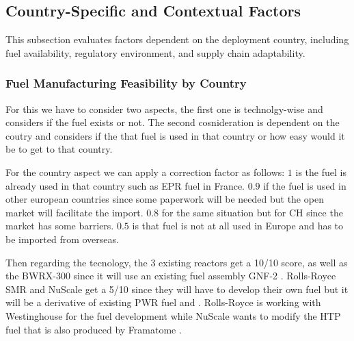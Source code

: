 


\subsection{Country-Specific and Contextual Factors}
This subsection evaluates factors dependent on the deployment country, including fuel availability, regulatory environment, and supply chain adaptability.

\subsubsection{Fuel Manufacturing Feasibility by Country}
For this we have to consider two aspects, the first one is technolgy-wise and considers if the fuel exists or not. The second cosnideration is dependent on the coutry and considers if the that fuel is used in that country or how easy would it be to get to that country.

For the country aspect we can apply a correction factor as follows: 
$1$ is the fuel is already used in that country such as EPR fuel in France. $0.9$ if the fuel is used in other european countries since some paperwork will be needed but the open market will facilitate the import. $0.8$ for the same situation but for CH since the market has some barriers. $0.5$ is that fuel is not at all used in Europe and has to be imported from overseas.

Then regarding the tecnology, the 3 existing reactors get a 10/10 score, as well as the BWRX-300 since it will use an existing fuel assembly GNF-2 \cite{CNSC_BWRX300_Fuel_Design}. Rolls-Royce SMR and NuScale get a 5/10 since they will have to develop their own fuel but it will be a derivative of existing PWR fuel \cite{RollsRoyce_SMR_UK_Fuel_2023} and \cite{NRC_ML17007A001}. Rolls-Royce is working with Westinghouse for the fuel development \cite{PLACEHOLDER} while NuScale wants to modify the HTP\texttrademark{} fuel that is also produced by Framatome \cite{Framatome_GNF2_Fuel_2018}.


